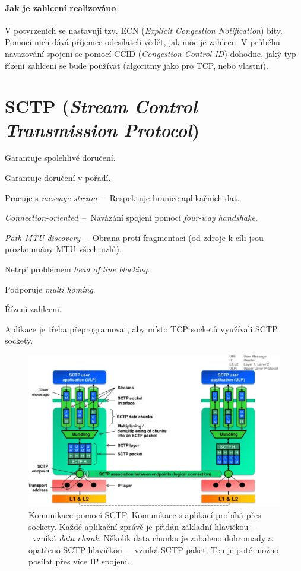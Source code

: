 \paragraph*{Jak je zahlcení realizováno} V potvrzeních se nastavují tzv. ECN (\textit{Explicit Congestion Notification}) bity. Pomocí nich dává příjemce odesílateli vědět, jak moc je zahlcen. V průběhu navazování spojení se pomocí CCID (\textit{Congestion Control ID}) dohodne, jaký typ řízení zahlcení se bude používat (algoritmy jako pro TCP, nebo vlastní).


\section{SCTP (\textit{Stream Control Transmission Protocol})}

\begin{compactitem}
    \item Garantuje spolehlivé doručení.
    \item Garantuje doručení v pořadí.
    \item Pracuje s \textit{message stream}~--~Respektuje hranice aplikačních dat.
    \item \textit{Connection-oriented}~--~Navázání spojení pomocí \textit{four-way handshake}.
    \item \textit{Path MTU discovery}~--~Obrana proti fragmentaci (od zdroje k cíli jsou prozkoumány MTU všech uzlů).
    \item Netrpí problémem \textit{head of line blocking}.
    \item Podporuje \textit{multi homing}.
    \item Řízení zahlceni.
    \item Aplikace je třeba přeprogramovat, aby místo TCP socketů využívali SCTP sockety.
\end{compactitem}

\begin{figure}[H]
    \centering
    \includegraphics[width=1\linewidth]{sctp_komunikace.png}
    \caption{Komunikace pomocí SCTP. Komunikace s aplikací probíhá přes sockety. Každé aplikační zprávě je přidán základní hlavičkou~--~vzniká \textit{data chunk}. Několik data chunku je zabaleno dohromady a opatřeno SCTP hlavičkou~--~vzniká SCTP paket. Ten je poté možno posílat přes více IP spojení.}
\end{figure}

